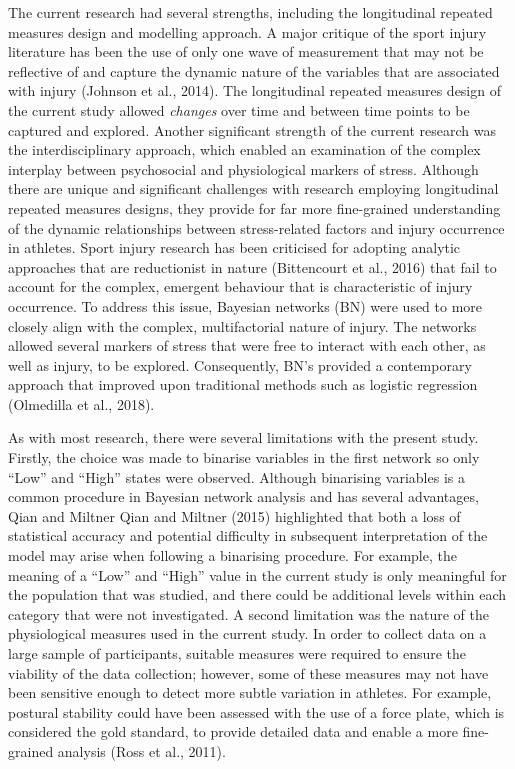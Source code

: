 \documentclass[
]{frontiersHLTH}
\begin{document}
The current research had several strengths, including the longitudinal
repeated measures design and modelling approach. A major critique of the
sport injury literature has been the use of only one wave of measurement
that may not be reflective of and capture the dynamic nature of the
variables that are associated with injury (Johnson et al., 2014). The
longitudinal repeated measures design of the current study allowed
\emph{changes} over time and between time points to be captured and
explored. Another significant strength of the current research was the
interdisciplinary approach, which enabled an examination of the complex
interplay between psychosocial and physiological markers of stress.
Although there are unique and significant challenges with research
employing longitudinal repeated measures designs, they provide for far
more fine-grained understanding of the dynamic relationships between
stress-related factors and injury occurrence in athletes. Sport injury
research has been criticised for adopting analytic approaches that are
reductionist in nature (Bittencourt et al., 2016) that fail to account
for the complex, emergent behaviour that is characteristic of injury
occurrence. To address this issue, Bayesian networks (BN) were used to
more closely align with the complex, multifactorial nature of injury.
The networks allowed several markers of stress that were free to
interact with each other, as well as injury, to be explored.
Consequently, BN's provided a contemporary approach that improved upon
traditional methods such as logistic regression (Olmedilla et al.,
2018).

As with most research, there were several limitations with the present
study. Firstly, the choice was made to binarise variables in the first
network so only ``Low'' and ``High'' states were observed. Although
binarising variables is a common procedure in Bayesian network analysis
and has several advantages, Qian and Miltner Qian and Miltner (2015)
highlighted that both a loss of statistical accuracy and potential
difficulty in subsequent interpretation of the model may arise when
following a binarising procedure. For example, the meaning of a ``Low''
and ``High'' value in the current study is only meaningful for the
population that was studied, and there could be additional levels within
each category that were not investigated. A second limitation was the
nature of the physiological measures used in the current study. In order
to collect data on a large sample of participants, suitable measures
were required to ensure the viability of the data collection; however,
some of these measures may not have been sensitive enough to detect more
subtle variation in athletes. For example, postural stability could have
been assessed with the use of a force plate, which is considered the
gold standard, to provide detailed data and enable a more fine-grained
analysis (Ross et al., 2011).
\end{document}

